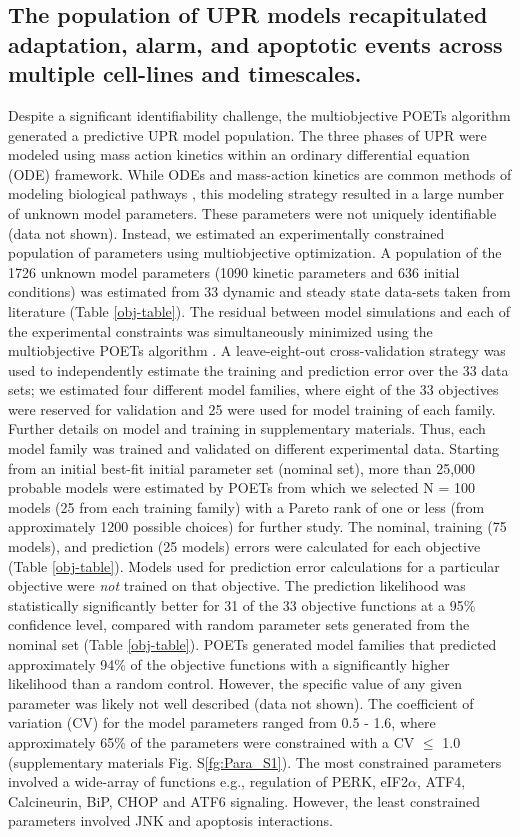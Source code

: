 \documentclass[fleqn,10pt]{wlscirep}
\begin{document}
\subsection*{The population of UPR models recapitulated adaptation, alarm, and apoptotic events across multiple cell-lines and timescales.}
Despite a significant identifiability challenge, the multiobjective POETs algorithm generated a predictive UPR model population.
The three phases of UPR were modeled using mass action kinetics within an ordinary differential equation (ODE) framework.
While ODEs and mass-action kinetics are common methods of modeling biological pathways \cite{Schoeberl:2002rv, Chen:2009uq, Helmy:2009kx}, this modeling strategy resulted in a large number of unknown model parameters.
These parameters were not uniquely identifiable (data not shown).
Instead, we estimated an experimentally constrained population of parameters using multiobjective optimization.
A population of the 1726 unknown model parameters (1090 kinetic parameters and 636 initial conditions) was estimated from 33 dynamic and steady state data-sets taken from literature (Table \ref{obj-table}).
The residual between model simulations and each of the experimental constraints was simultaneously minimized using the multiobjective POETs algorithm \cite{Song:2010ij}.
A leave-eight-out cross-validation strategy was used to independently estimate the training and prediction error over the 33 data sets; we estimated four different model families, where eight of the 33 objectives were reserved for validation and 25 were used for model training of each family.
Further details on model and training in supplementary materials.
Thus, each model family was trained and validated on different experimental data.
Starting from an initial best-fit initial parameter set (nominal set), more than 25,000 probable models were estimated by POETs from which we selected N = 100 models (25 from each training family) with a Pareto rank of one or less (from approximately 1200 possible choices) for further study.
The nominal, training (75 models), and prediction (25 models) errors were calculated for each objective (Table \ref{obj-table}).
Models used for prediction error calculations for a particular objective were \emph{not} trained on that objective.
The prediction likelihood was statistically significantly better for 31 of the 33 objective functions at a 95\% confidence level, compared with random parameter sets generated from the nominal set (Table \ref{obj-table}).
POETs generated model families that predicted approximately 94\% of the objective functions with a significantly higher likelihood than a random control.
However, the specific value of any given parameter was likely not well described (data not shown).
The coefficient of variation (CV) for the model parameters ranged from 0.5 - 1.6, where approximately 65\% of the parameters were constrained with a CV $\leq$ 1.0 (supplementary materials Fig. S\ref{fg:Para_S1}).
The most constrained parameters involved a wide-array of functions e.g., regulation of PERK, eIF2$\alpha$, ATF4, Calcineurin, BiP, CHOP and ATF6 signaling.
However, the least constrained parameters involved JNK and apoptosis interactions.
\end{document}
